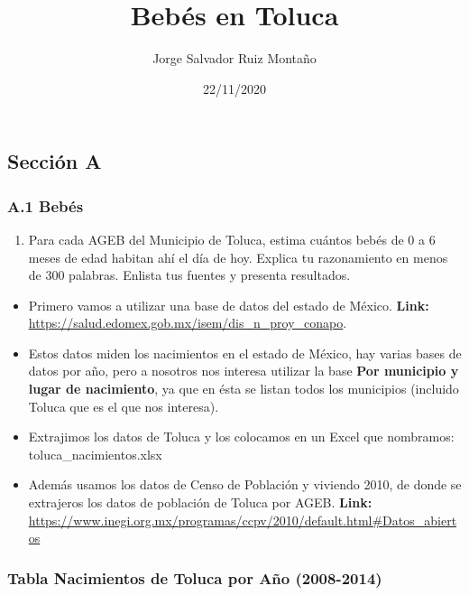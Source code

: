 \documentclass[
  landscape]{article}
\title{Bebés en Toluca}
\author{Jorge Salvador Ruiz Montaño}
\date{22/11/2020}
\providecommand{\tightlist}{%
  \setlength{\itemsep}{0pt}\setlength{\parskip}{0pt}}
\begin{document}
\maketitle

\hypertarget{secciuxf3n-a}{%
\subsection{Sección A}\label{secciuxf3n-a}}

\hypertarget{a.1-bebuxe9s}{%
\subsubsection{A.1 Bebés}\label{a.1-bebuxe9s}}

\begin{enumerate}
\def\labelenumi{\arabic{enumi}.}
\tightlist
\item
  Para cada AGEB del Municipio de Toluca, estima cuántos bebés de 0 a 6
  meses de edad habitan ahí el día de hoy. Explica tu razonamiento en
  menos de 300 palabras. Enlista tus fuentes y presenta resultados.
\end{enumerate}

\begin{itemize}
\tightlist
\item
  Primero vamos a utilizar una base de datos del estado de México.
  \textbf{Link:}
  \url{https://salud.edomex.gob.mx/isem/dis_n_proy_conapo}.
\item
  Estos datos miden los nacimientos en el estado de México, hay varias
  bases de datos por año, pero a nosotros nos interesa utilizar la base
  \textbf{Por municipio y lugar de nacimiento}, ya que en ésta se listan
  todos los municipios (incluido Toluca que es el que nos interesa).
\item
  Extrajimos los datos de Toluca y los colocamos en un Excel que
  nombramos: toluca\_nacimientos.xlsx
\item
  Además usamos los datos de Censo de Población y viviendo 2010, de
  donde se extrajeros los datos de población de Toluca por AGEB.
  \textbf{Link:}
  \url{https://www.inegi.org.mx/programas/ccpv/2010/default.html\#Datos_abiertos}
\end{itemize}

\hypertarget{tabla-nacimientos-de-toluca-por-auxf1o-2008-2014}{%
\subsubsection{Tabla Nacimientos de Toluca por Año
(2008-2014)}\label{tabla-nacimientos-de-toluca-por-auxf1o-2008-2014}}
\end{document}
